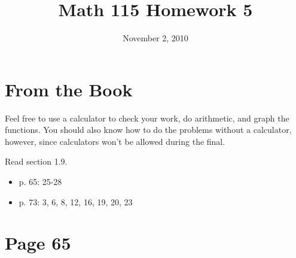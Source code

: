 \documentclass[fleqn,addpoints]{exam}
\title{Math 115 Homework 5}
\date{November 2, 2010}
\begin{document}
\maketitle
 
\section{From the Book}


Feel free to use a calculator to check your work, do arithmetic, and graph the functions.  You should also know how
to do the problems without a calculator, however, since calculators won't be allowed during the final.

\vspace{0.2 cm}

Read section 1.9.
 
\begin{itemize}
  \item p. 65: 25-28
  \item p. 73: 3, 6, 8, 12, 16, 19, 20, 23
\end{itemize}

\section{Page 65}
\end{document}
